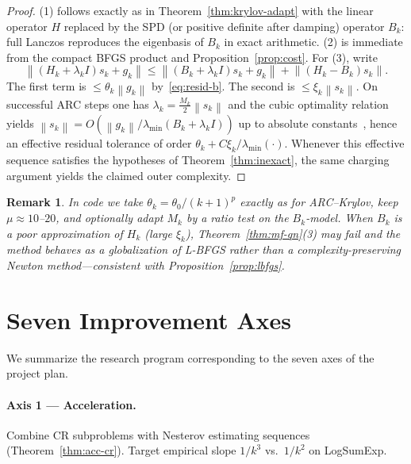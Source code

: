 \documentclass[11pt,a4paper]{article}
\newtheorem{remark}[theorem]{Remark}
\newcommand{\norm}[1]{\left\|#1\right\|}
\begin{document}
\begin{proof}
(1) follows exactly as in Theorem~\ref{thm:krylov-adapt} with the linear operator $H$ replaced by the SPD (or positive definite after damping) operator $B_{k}$: full Lanczos reproduces the eigenbasis of $B_{k}$ in exact arithmetic.
(2) is immediate from the compact BFGS product and Proposition~\ref{prop:cost}.
For (3), write
\[
\norm{(H_{k}+\lambda_{k}I)s_{k}+g_{k}}
\le
\norm{(B_{k}+\lambda_{k}I)s_{k}+g_{k}}
+
\norm{(H_{k}-B_{k})s_{k}}.
\]
The first term is $\le\theta_{k}\norm{g_{k}}$ by~\eqref{eq:resid-b}.
The second is $\le\xi_{k}\norm{s_{k}}$.
On successful ARC steps one has $\lambda_{k}=\tfrac{M_{k}}{2}\norm{s_{k}}$ and the cubic optimality relation yields $\norm{s_{k}}=O(\norm{g_{k}}/\lambda_{\min}(B_{k}+\lambda_{k}I))$ up to absolute constants~\cite{cartis2011arc}, hence an effective residual tolerance of order $\theta_{k}+C\xi_{k}/\lambda_{\min}(\cdot)$.
Whenever this effective sequence satisfies the hypotheses of Theorem~\ref{thm:inexact}, the same charging argument yields the claimed outer complexity.
\end{proof}

\begin{remark}
\label{rem:mf-qn-practice}
In code we take $\theta_{k}=\theta_{0}/(k+1)^{p}$ exactly as for ARC--Krylov, keep $\mu\approx 10$--$20$, and optionally adapt $M_{k}$ by a ratio test on the $B_{k}$-model.
When $B_{k}$ is a poor approximation of $H_{k}$ (large $\xi_{k}$), Theorem~\ref{thm:mf-qn}(3) may fail and the method behaves as a globalization of L-BFGS rather than a complexity-preserving Newton method---consistent with Proposition~\ref{prop:lbfgs}.
\end{remark}

\section{Seven Improvement Axes}
\label{sec:axes}

We summarize the research program corresponding to the seven axes of the project plan.

\paragraph{Axis 1 --- Acceleration.}
Combine CR subproblems with Nesterov estimating sequences (Theorem~\ref{thm:acc-cr}). Target empirical slope $1/k^{3}$ vs.\ $1/k^{2}$ on LogSumExp.
\end{document}

